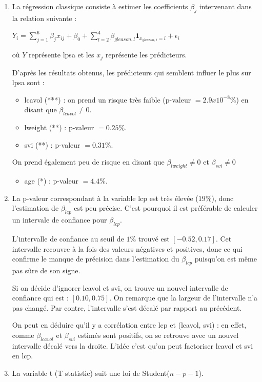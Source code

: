 \documentclass[a4paper, 12pt]{article}
\begin{document}
\begin{enumerate}
\item
La régression classique consiste à estimer les coefficients $\beta_{j}$ intervenant dans la relation suivante :

$ Y_{i} = \sum\limits_{j=1}^6 \beta_{j} x_{ij} + \beta_{0} + \sum\limits_{l=2}^4 \beta_{gleason, l} \mathbf{1}_{x_{gleason, i}=l} + \epsilon_{i} $

où $Y$ représente lpsa et les $x_{j}$ représente les prédicteurs.  

D'après les résultats obtenus, les prédicteurs qui semblent influer le plus sur lpsa sont :
\begin{itemize}
\item lcavol (***) : on prend un risque très faible (p-valeur $=2.9x10^{-8}\%$) en disant que $\beta_{lcavol} \neq 0$.
\item lweight (**) : p-valeur $=0.25\%$.
\item svi (**) : p-valeur $=0.31\%$.
\end{itemize}
On prend également peu de risque en disant que $\beta_{lweight} \neq 0$ et $\beta_{svi} \neq 0$ 
\begin{itemize}
\item age (*) : p-valeur $=4.4\%$.
\end{itemize}

\item La p-valeur correspondant à la variable lcp est très élevée ($19\%$), donc l'estimation de $\beta_{lcp}$ est peu précise. C'est pourquoi il est préférable de calculer un intervale de confiance pour $\beta_{lcp}$.

L'intervalle de confiance au seuil de $1\%$ trouvé est $[-0.52, 0.17]$. Cet intervalle recouvre à la fois des valeurs négatives et positives, donc ce qui confirme le manque de précision dans l'estimation du $\beta_{lcp}$ puisqu'on est même pas sûre de son signe.

Si on décide d'ignorer lcavol et svi, on trouve un nouvel intervalle de confiance qui est : $[0.10, 0.75]$. On remarque que la largeur de l'intervalle n'a pas changé. Par contre, l'intervalle s'est décalé par rapport au précédent. 

On peut en déduire qu'il y a corrélation entre lcp et (lcavol, svi) : en effet, comme $\beta_{lcavol}$ et $\beta_{svi}$ estimés sont positifs, on se retrouve avec un nouvel intervalle décalé vers la droite. L'idée c'est qu'on peut factoriser lcavol et svi en lcp.

\item La variable t (T statistic) suit une loi de Student($n-p-1$).


\end{enumerate}
\end{document}
